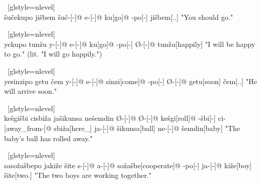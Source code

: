 \ex~[glstyle=nlevel]
\begingl
\glpreamble {} \\ šučekupo jišbem
\endpreamble
šuč-[{\Deo}-]@
e-[{\Pfv}-]@
ku[go]@
-po[-{\Hg}]
jišbem[{\Spol}.{\Hg}.{\Nom}]
\glft "You should go."
\endgl
\xe

\ex~[glstyle=nlevel]
\begingl
\glpreamble {} \\ yekupo tunžu
\endpreamble
y-[{\Subj}-]@
e-[{\Pfv}-]@
ku[go]@
-po[-{\Hg}]
Ø-[{\Pfv}-]@
tunžu[happily]
\glft "I will be happy to go." (lit. "I will go happily.")
\endgl
\xe

\ex~[glstyle=nlevel]
\begingl
\glpreamble {} \\ yesinzipo getu čem
\endpreamble
y-[{\Subj}-]@
e-[{\Pfv}-]@
sinzi[come]@
-po[-{\Hg}]
Ø-[{\Pfv}-]@
getu[soon]
čem[{\T}.{\Hg}.{\Nom}]
\glft "He will arrive soon."
\endgl
\xe

\ex~[glstyle=nlevel]
\begingl
\glpreamble {} \\ kešgišbi cisbiža jašikunsa nešemdin
\endpreamble
Ø-[{\Ind}-]@
Ø-[{\Pfv}-]@
kešgi[roll]@
-šbi[-{\Inan}]
ci-[away\_from-]@
sbiža[here\_{\Prox}]
ja-[{\Nom}-]@
šikunsa[ball]
ne-[{\Gen}-]@
šemdin[baby]
\glft "The baby's ball has rolled away."
\endgl
\xe

\ex~[glstyle=nlevel]
\begingl
\glpreamble {} \\ sasožašbepo jakiže šite
\endpreamble
s-[{\Ind}-]@
a-[{\Prog}-]@
sožašbe[cooperate]@
-po[-{\Hg}]
ja-[{\Nom}-]@
kiže[boy]
šite[two.{\Hg}]
\glft "The two boys are working together."
\endgl
\xe


\endgroup
\iffalse


\ex~[glstyle=nlevel]
\begingl
\glpreamble \SG{} \\ 
\endpreamble

\glft 
\endgl
\xe


\fi